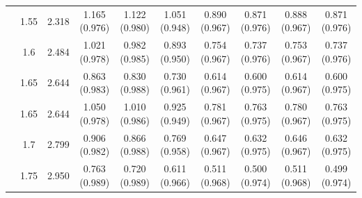 \begin{tabular}{c c c c c c c c c c}
\addlinespace
4.5 & 1.55 & 2.318 & 1.165 (0.976) & 1.122 (0.980) & 1.051 (0.948) & 0.890 (0.967) & 0.871 (0.976) & 0.888 (0.967) & 0.871 (0.976) \\
 & 1.6 & 2.484 & 1.021 (0.978) & 0.982 (0.985) & 0.893 (0.950) & 0.754 (0.967) & 0.737 (0.976) & 0.753 (0.967) & 0.737 (0.976) \\
 & 1.65 & 2.644 & 0.863 (0.983) & 0.830 (0.988) & 0.730 (0.961) & 0.614 (0.967) & 0.600 (0.975) & 0.614 (0.967) & 0.600 (0.975) \\
\addlinespace
5 & 1.65 & 2.644 & 1.050 (0.978) & 1.010 (0.986) & 0.925 (0.949) & 0.781 (0.967) & 0.763 (0.975) & 0.780 (0.967) & 0.763 (0.975) \\
 & 1.7 & 2.799 & 0.906 (0.982) & 0.866 (0.988) & 0.769 (0.958) & 0.647 (0.967) & 0.632 (0.975) & 0.646 (0.967) & 0.632 (0.975) \\
 & 1.75 & 2.950 & 0.763 (0.989) & 0.720 (0.989) & 0.611 (0.966) & 0.511 (0.968) & 0.500 (0.974) & 0.511 (0.968) & 0.499 (0.974) \\
\bottomrule
\end{tabular}
